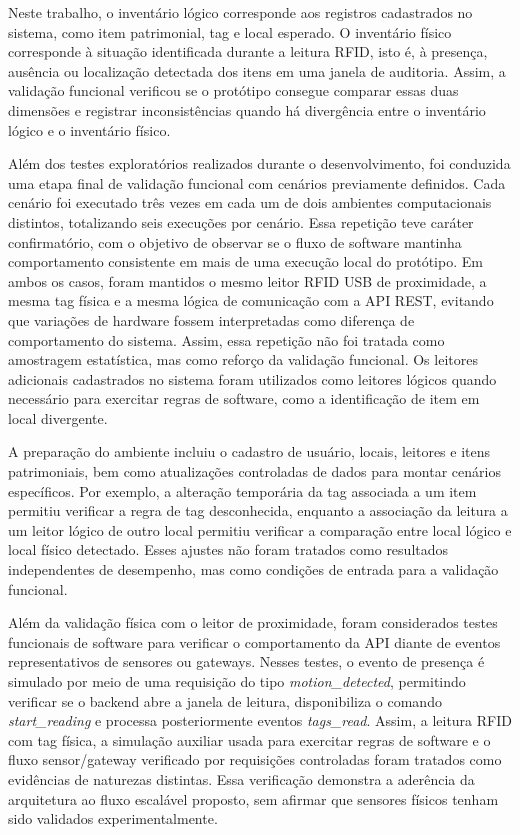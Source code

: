 Neste trabalho, o inventário lógico corresponde aos registros cadastrados no sistema, como item patrimonial, tag e local esperado. O inventário físico corresponde à situação identificada durante a leitura RFID, isto é, à presença, ausência ou localização detectada dos itens em uma janela de auditoria. Assim, a validação funcional verificou se o protótipo consegue comparar essas duas dimensões e registrar inconsistências quando há divergência entre o inventário lógico e o inventário físico.

Além dos testes exploratórios realizados durante o desenvolvimento, foi conduzida uma etapa final de validação funcional com cenários previamente definidos. Cada cenário foi executado três vezes em cada um de dois ambientes computacionais distintos, totalizando seis execuções por cenário. Essa repetição teve caráter confirmatório, com o objetivo de observar se o fluxo de software mantinha comportamento consistente em mais de uma execução local do protótipo. Em ambos os casos, foram mantidos o mesmo leitor RFID USB de proximidade, a mesma tag física e a mesma lógica de comunicação com a API REST, evitando que variações de hardware fossem interpretadas como diferença de comportamento do sistema. Assim, essa repetição não foi tratada como amostragem estatística, mas como reforço da validação funcional. Os leitores adicionais cadastrados no sistema foram utilizados como leitores lógicos quando necessário para exercitar regras de software, como a identificação de item em local divergente.

A preparação do ambiente incluiu o cadastro de usuário, locais, leitores e itens patrimoniais, bem como atualizações controladas de dados para montar cenários específicos. Por exemplo, a alteração temporária da tag associada a um item permitiu verificar a regra de tag desconhecida, enquanto a associação da leitura a um leitor lógico de outro local permitiu verificar a comparação entre local lógico e local físico detectado. Esses ajustes não foram tratados como resultados independentes de desempenho, mas como condições de entrada para a validação funcional.

Além da validação física com o leitor de proximidade, foram considerados testes funcionais de software para verificar o comportamento da API diante de eventos representativos de sensores ou gateways. Nesses testes, o evento de presença é simulado por meio de uma requisição do tipo \textit{motion\_detected}, permitindo verificar se o backend abre a janela de leitura, disponibiliza o comando \textit{start\_reading} e processa posteriormente eventos \textit{tags\_read}. Assim, a leitura RFID com tag física, a simulação auxiliar usada para exercitar regras de software e o fluxo sensor/gateway verificado por requisições controladas foram tratados como evidências de naturezas distintas. Essa verificação demonstra a aderência da arquitetura ao fluxo escalável proposto, sem afirmar que sensores físicos tenham sido validados experimentalmente.

